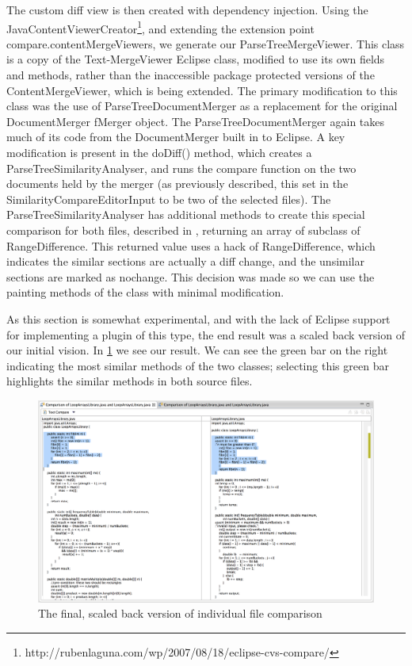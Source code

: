 The custom diff view is then created with dependency injection. Using the
JavaContentViewerCreator\footnote{http://rubenlaguna.com/wp/2007/08/18/eclipse-cvs-compare/}, and extending the extension point
compare.contentMergeViewers, we generate our ParseTreeMergeViewer.
This class is a copy of the Text-MergeViewer Eclipse class, modified to use
its own fields and methods, rather than the inaccessible package protected versions
of the ContentMergeViewer, which is being extended. The primary modification
to this class was the use of ParseTreeDocumentMerger as a replacement for the
original DocumentMerger fMerger object. The ParseTreeDocumentMerger again takes
much of its code from the DocumentMerger built in to Eclipse. A key modification
is present in the doDiff() method, which creates a ParseTreeSimilarityAnalyser,
and runs the compare function on the two documents held by the merger (as 
previously described, this set in the SimilarityCompareEditorInput to be
two of the selected files). The ParseTreeSimilarityAnalyser has additional
methods to create this special comparison for both files, described in 
, returning an array of subclass of RangeDifference.
This returned value uses a hack of RangeDifference, which indicates the similar
sections are actually a diff change, and the unsimilar sections are marked
as nochange. This decision was made so we can use the painting methods of the
class with minimal modification.

As this section is somewhat experimental, and with the lack of Eclipse
support for implementing a plugin of this type, the end result was a scaled
back version of our initial vision. In \cref{fig:finalCodeCompare} we see
our result. We can see the green bar on the right indicating the most similar
methods of the two classes; selecting this green bar highlights the similar
methods in both source files.

\begin{figure}[H]
	\centering
		\includegraphics[width=\textwidth]{Figures/FinalCodeCompare}
	\caption{The final, scaled back version of individual file comparison}
	\label{fig:finalCodeCompare}
\end{figure}


